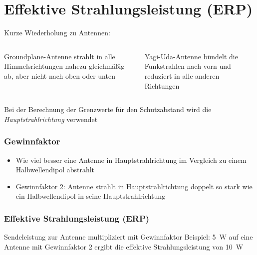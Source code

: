 
\section{Effektive Strahlungsleistung (ERP)}
\label{section:effektive_strahlungsleistung_erp_1}
\begin{frame}%
Kurze Wiederholung zu Antennen:
\begin{columns}
    \begin{column}{0.48\textwidth}
    Groundplane-Antenne strahlt in alle Himmelsrichtungen nahezu gleichmäßig ab, aber nicht nach oben oder unten


    \end{column}
   \begin{column}{0.48\textwidth}
       Yagi-Uda-Antenne bündelt die Funkstrahlen nach vorn und reduziert in alle anderen Richtungen


   \end{column}
\end{columns}
    \pause
    Bei der Berechnung der Grenzwerte für den Schutzabstand wird die \emph{Hauptstrahlrichtung} verwendet



\end{frame}

\begin{frame}
\frametitle{Gewinnfaktor}
\begin{itemize}
  \item Wie viel besser eine Antenne in Hauptstrahlrichtung im Vergleich zu einem Halbwellendipol abstrahlt
  \item Gewinnfaktor 2: Antenne strahlt in Hauptstrahlrichtung doppelt so stark wie ein Halbwellendipol in seine Hauptstrahlrichtung
  \end{itemize}

\end{frame}

\begin{frame}
\frametitle{Effektive Strahlungsleistung (ERP)}
Sendeleistung zur Antenne multipliziert mit Gewinnfaktor
    \pause
    Beispiel: 5~W auf eine Antenne mit Gewinnfaktor 2 ergibt die effektive Strahlungsleistung von 10~W

\end{frame}

